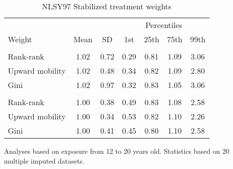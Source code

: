 \begin{table}[htp]
\centering
\footnotesize
\setlength{\tabcolsep}{10pt}
\renewcommand{\arraystretch}{1}
\begin{threeparttable}
\centering
\caption{NLSY97 Stabilized treatment weights}
\label{tab:nlsy97_ipt_weigths}
\begin{tabular}{lcccccc}
  \hline
\multicolumn{3}{c}{} & \multicolumn{4}{c}{Percentiles} \\
 \cmidrule{4-7}
Weight & Mean & SD & 1st & 25th & 75th & 99th \\
  \hline
  \addlinespace
  \multicolumn{7}{l}{\textit{Continuous exposure}} \\
  \addlinespace
\quad Rank-rank & 1.02 & 0.72 & 0.29 & 0.81 & 1.09 & 3.06 \\
  \quad Upward mobility & 1.02 & 0.48 & 0.34 & 0.82 & 1.09 & 2.80 \\
  \quad Gini & 1.02 & 0.97 & 0.32 & 0.83 & 1.05 & 3.06 \\
  \addlinespace
  \multicolumn{7}{l}{\textit{Categorical exposure}} \\
  \addlinespace
  \quad Rank-rank & 1.00 & 0.38 & 0.49 & 0.83 & 1.08 & 2.58 \\
  \quad Upward mobility & 1.00 & 0.34 & 0.53 & 0.82 & 1.10 & 2.26 \\
  \quad Gini & 1.00 & 0.41 & 0.45 & 0.80 & 1.10 & 2.58 \\
   \hline
\end{tabular}
\begin{tablenotes}
\footnotesize
\item Analyses based on exposure from 12 to 20 years old. Statistics based on  20 multiple imputed datasets.
\end{tablenotes}
\end{threeparttable}
\end{table}
